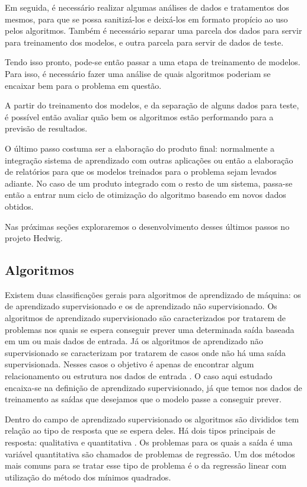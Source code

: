 			Em seguida, é necessário realizar algumas análises de dados e tratamentos dos mesmos, para que se possa sanitizá-los e deixá-los em formato propício ao uso pelos algoritmos. Também é necessário separar uma parcela dos dados para servir para treinamento dos modelos, e outra parcela para servir de dados de teste.

			Tendo isso pronto, pode-se então passar a uma etapa de treinamento de modelos. Para isso, é necessário fazer uma análise de quais algoritmos poderiam se encaixar bem para o problema em questão.

			A partir do treinamento dos modelos, e da separação de alguns dados para teste, é possível então avaliar quão bem os algoritmos estão performando para a previsão de resultados.

			O último passo costuma ser a elaboração do produto final: normalmente a integração sistema de aprendizado com outras aplicações ou então a elaboração de relatórios para que os modelos treinados para o problema sejam levados adiante. No caso de um produto integrado com o resto de um sistema, passa-se então a entrar num ciclo de otimização do algoritmo baseado em novos dados obtidos.

			Nas próximas seções exploraremos o desenvolvimento desses últimos passos no projeto Hedwig.

		\subsection{Algoritmos}

			Existem duas classificações gerais para algoritmos de aprendizado de máquina: os de aprendizado supervisionado e os de aprendizado não supervisionado. Os algoritmos de aprendizado supervisionado são caracterizados por tratarem de problemas nos quais se espera conseguir prever uma determinada saída baseada em um ou mais dados de entrada. Já os algoritmos de aprendizado não supervisionado se caracterizam por tratarem de casos onde não há uma saída supervisionada. Nesses casos o objetivo é apenas de encontrar algum relacionamento ou estrutura nos dados de entrada \cite{islr}. O caso aqui estudado encaixa-se na definição de aprendizado supervisionado, já que temos nos dados de treinamento as saídas que desejamos que o modelo passe a conseguir prever.

			Dentro do campo de aprendizado supervisionado os algoritmos são divididos tem relação ao tipo de resposta que se espera deles. Há dois tipos principais de resposta: qualitativa e quantitativa  \cite{islr}. Os problemas para os quais a saída é uma variável quantitativa são chamados de problemas de regressão. Um dos métodos mais comuns para se tratar esse tipo de problema é o da regressão linear com utilização do método dos mínimos quadrados.

